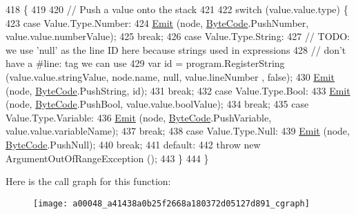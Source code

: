 \begin{DoxyCode}
418                                                              \{
419 
420             \textcolor{comment}{// Push a value onto the stack}
421 
422             \textcolor{keywordflow}{switch} (value.value.type) \{
423             \textcolor{keywordflow}{case} Value.Type.Number:
424                 \hyperlink{a00048_a774e8c143cdda0584fcfdda98626a83c}{Emit} (node, \hyperlink{a00045_ad5dfb6ee68ca7469623ad3e459f98894}{ByteCode}.PushNumber, value.value.numberValue);
425                 \textcolor{keywordflow}{break};
426             \textcolor{keywordflow}{case} Value.Type.String:
427                 \textcolor{comment}{// TODO: we use 'null' as the line ID here because strings used in expressions}
428                 \textcolor{comment}{// don't have a #line: tag we can use}
429                 var \textcolor{keywordtype}{id} = program.RegisterString (value.value.stringValue, node.name, null, value.lineNumber
      , \textcolor{keyword}{false});
430                 \hyperlink{a00048_a774e8c143cdda0584fcfdda98626a83c}{Emit} (node, \hyperlink{a00045_ad5dfb6ee68ca7469623ad3e459f98894}{ByteCode}.PushString, \textcolor{keywordtype}{id});
431                 \textcolor{keywordflow}{break};
432             \textcolor{keywordflow}{case} Value.Type.Bool:
433                 \hyperlink{a00048_a774e8c143cdda0584fcfdda98626a83c}{Emit} (node, \hyperlink{a00045_ad5dfb6ee68ca7469623ad3e459f98894}{ByteCode}.PushBool, value.value.boolValue);
434                 \textcolor{keywordflow}{break};
435             \textcolor{keywordflow}{case} Value.Type.Variable:
436                 \hyperlink{a00048_a774e8c143cdda0584fcfdda98626a83c}{Emit} (node, \hyperlink{a00045_ad5dfb6ee68ca7469623ad3e459f98894}{ByteCode}.PushVariable, value.value.variableName);
437                 \textcolor{keywordflow}{break};
438             \textcolor{keywordflow}{case} Value.Type.Null:
439                 \hyperlink{a00048_a774e8c143cdda0584fcfdda98626a83c}{Emit} (node, \hyperlink{a00045_ad5dfb6ee68ca7469623ad3e459f98894}{ByteCode}.PushNull);
440                 \textcolor{keywordflow}{break};
441             \textcolor{keywordflow}{default}:
442                 \textcolor{keywordflow}{throw} \textcolor{keyword}{new} ArgumentOutOfRangeException ();
443             \}
444         \}
\end{DoxyCode}


Here is the call graph for this function\-:
\nopagebreak
\begin{figure}[H]
\begin{center}
\leavevmode
\texttt{[image: a00048\_a41438a0b25f2668a180372d05127d891\_cgraph]}
\end{center}
\end{figure}


